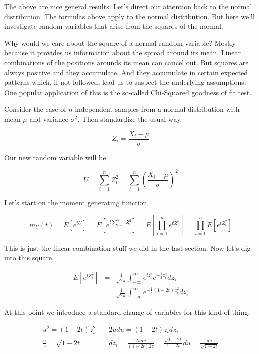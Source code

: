 \documentclass[]{article}
\begin{document}
The above are nice general results.  Let's direct our attention
back to the normal distribution.  The formulas above apply to
the normal distribution.  But here we'll investigate random
variables that arise from the squares of the normal.

Why would we care about the square of a normal random
variable?  Mostly because it provides us information about
the spread around its mean.  Linear combinations of the
positions arounds its mean can cancel out.
But squares are always positive and they accumulate.
And they accumulate in certain expected patterns which, if not
followed, lead us to suspect the underlying assumptions.
One popular application of this is the so-called Chi-Squared
goodness of fit test.

Consider the case of $n$ independent samples from a normal
distribution with mean $\mu$ and variance $\sigma^2$.  Then
standardize the usual way.

$$
Z_i = \frac{X_i - \mu}{\sigma}
$$

Our new random variable will be

$$
U = \sum_{i=1}^n Z_i^2 = \sum_{i=1}^n \left( 
    \frac{X_i - \mu}{\sigma} \right)^2
$$

Let's start on the moment generating function.

\begin{equation}
m_U(t) = E \left[ e^{tU} \right]
 = E \left[ e^{t \sum_{i=1}^n Z_i^2} \right]
 = E \left[ \prod_{i=1}^n e^{t Z_i^2} \right]
 = \prod_{i=1}^n E \left[ e^{t Z_i^2} \right] \label{norm_sq1}
\end{equation}

This is just the linear combination stuff we did in the
last section.  Now let's dig into this square.

\begin{eqnarray}
E \left[ e^{t Z_i^2} \right] &= & \frac{1}{\sqrt{2\pi}}
     \int_{-\infty}^{\infty} e^{tz_i^2} e^{-\frac{1}{2} z_i^2}
     dz_i \nonumber \\
  &= & \frac{1}{\sqrt{2\pi}}
     \int_{-\infty}^{\infty} e^{-\frac{1}{2} (1-2t)z_i^2}
      dz_i \label{norm_sq2}
\end{eqnarray}

At this point we introduce a standard change of variables for
this kind of thing.

\begin{eqnarray*}
u^2 = (1-2t)z_i^2 & \; &2udu = (1-2t)z_idz_i \\
\frac{u}{z} = \sqrt{1-2t} & \; &dz_i = \frac{2udu}{(1-2t)2z}
    = \frac{\sqrt{1-2t}}{1-2t} du = \frac{du}{\sqrt{1-2t}}
\end{eqnarray*}
\end{document}
